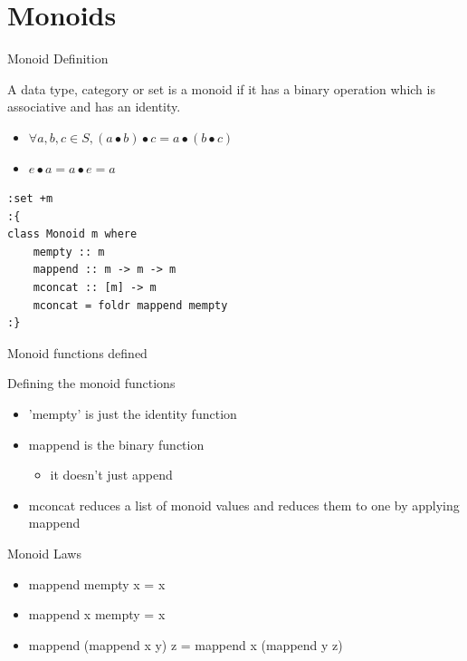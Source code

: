 \documentclass[presetation]{beamer}
\begin{document}
\section{Monoids}
\label{sec:orgd271da9}
\begin{frame}[fragile,label={sec:orgb039131}]{Monoid Definition}
 \begin{definition}
A data type, category or set is a \alert{monoid} if it has a binary
operation \textbullet{} which is associative and has an identity.
\begin{itemize}
\item \(\forall a,b,c \in S, (a \bullet b) \bullet c = a \bullet (b \bullet c)\)
\item \(e \bullet a = a \bullet e = a\)
\end{itemize}

\begin{verbatim}
:set +m
:{
class Monoid m where
    mempty :: m
    mappend :: m -> m -> m
    mconcat :: [m] -> m
    mconcat = foldr mappend mempty
:}
\end{verbatim}
\end{definition}
\end{frame}

\begin{frame}[label={sec:org0e5efff}]{Monoid functions defined}
\begin{block}{Defining the monoid functions}
\begin{itemize}
\item 'mempty' is just the identity function
\item mappend is the binary function
\begin{itemize}
\item \alert{it doesn't just append}
\end{itemize}
\item mconcat reduces a list of monoid values and reduces them to one by
applying mappend
\end{itemize}
\end{block}
\end{frame}

\begin{frame}[label={sec:org516b46c}]{Monoid Laws}
\begin{theorem}
\begin{itemize}
\item mappend mempty x = x
\item mappend x mempty = x
\item mappend (mappend x y) z = mappend x (mappend y z)
\end{itemize}
\end{theorem}
\end{frame}
\end{document}
